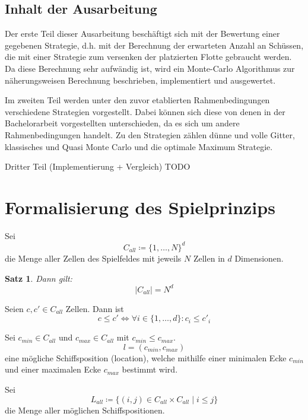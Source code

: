 \documentclass[a4paper,12pt]{llncs}
\numberwithin{equation}{section}
\newtheorem{satz}{Satz}
\begin{document}
\subsection{Inhalt der Ausarbeitung}

Der erste Teil dieser Ausarbeitung beschäftigt sich mit der Bewertung einer gegebenen Strategie, d.h. mit der Berechnung der erwarteten Anzahl an Schüssen, die mit einer Strategie zum versenken der platzierten Flotte gebraucht werden.
Da diese Berechnung sehr aufwändig ist, wird ein Monte-Carlo Algorithmus zur näherungsweisen Berechnung beschrieben, implementiert und ausgewertet.

Im zweiten Teil werden unter den zuvor etablierten Rahmenbedingungen verschiedene Strategien vorgestellt. Dabei können sich diese von denen in der Bachelorarbeit vorgestellten unterschieden, da es sich um andere Rahmenbedingungen handelt. Zu den Strategien zählen dünne und volle Gitter, klassisches und Quasi Monte Carlo und die optimale Maximum Strategie.

Dritter Teil (Implementierung + Vergleich) TODO 

\section{Formalisierung des Spielprinzips}

\begin{definition}
Sei
\[
C_{all} \coloneqq \{1, \dots, N\}^d
\]
die Menge aller Zellen des Spielfeldes mit jeweils $N$ Zellen in $d$ Dimensionen.
\end{definition}

\begin{satz}
Dann gilt:
\[
|C_{all}|=N^d
\]
\end{satz}

\begin{definition}
Seien $c, c' \in C_{all}$ Zellen.
Dann ist
\[
c \leq c' \Leftrightarrow \forall i \in \{1, \dots, d\} \colon c_{i} \leq c'_{i} 
\]
\end{definition}

\begin{definition}
Sei $c_{min} \in C_{all}$ und $c_{max} \in C_{all}$ mit $c_{min} \leq c_{max}$.
\[
l=(c_{min}, c_{max})
\]
eine mögliche Schiffsposition (location), welche mithilfe einer minimalen Ecke $c_{min}$ und einer maximalen Ecke $c_{max}$ bestimmt wird.
\end{definition}

\begin{definition}
Sei 
\[
L_{all} \coloneqq
\{
(i, j) \in C_{all} \times C_{all}
\mid
i \leq j
\}
\] die Menge aller möglichen Schiffspositionen.
\end{definition}
\end{document}
